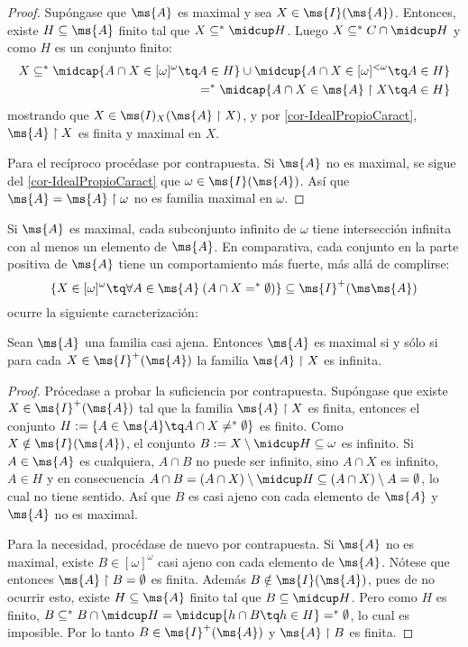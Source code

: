 	\begin{proof}
		Supóngase que $\ms{A}$ es maximal y sea $X \in \ms{I}(\ms{A})$. Entonces, existe $H \subseteq \ms{A}$ finito tal que $X \subseteq^* \midcup H$. Luego $X \subseteq^* C \cap \midcup H$ y como $H$ es un conjunto finito:
		\begin{align*}
			X \subseteq^* \midcap\{ A \cap X \in [\omega]^\omega \tq A \in H \} \cup \midcup\{ A \cap X \in [\omega]^{<\omega} \tq A \in H \} \\
			=^* \midcap\{ A \cap X \in \ms{A} \upharpoonright X \tq A \in H \}
		\end{align*}
		mostrando que $X \in \ms(I)_X(\ms{A}\upharpoonright X)$, y por \ref{cor-IdealPropioCaract}, $\ms{A} \upharpoonright X$ es finita y maximal en $X$.

		Para el recíproco procédase por contrapuesta. Si $\ms{A}$ no es maximal, se sigue del \autoref{cor-IdealPropioCaract} que $\omega \in \ms{I}(\ms{A})$. Así que $\ms{A} = \ms{A} \upharpoonright \omega$ no es familia maximal en $\omega$. 
	\end{proof}

	Si $\ms{A}$ es maximal, cada subconjunto infinito de $\omega$ tiene intersección infinita con al menos un elemento de $\ms{A}$. En comparativa, cada conjunto en la parte positiva de $\ms{A}$ tiene un comportamiento más fuerte, más allá de complirse:
	\[ \{X \in [\omega]^{\omega} \tq \forall A \in \ms{A} \: (A \cap X =^* \emptyset) \} \subseteq \ms{I}^+(\ms\ms{A}) \]
	ocurre la siguiente caracterización:

	\begin{proposicion}\label{prop-CaracMADPositiv}
		Sean $\ms{A}$ una familia casi ajena. Entonces $\ms{A}$ es maximal si y sólo si para cada $X \in \ms{I}^+(\ms{A})$ la familia $\ms{A} \upharpoonright X$ es infinita.
	\end{proposicion}
	
	\begin{proof}
		Prócedase a probar la suficiencia por contrapuesta. Supóngase que existe $X \in \ms{I}^+(\ms{A})$ tal que la familia $\ms{A} \upharpoonright X$ es finita, entonces el conjunto $H:=\{ A \in \ms{A} \tq A \cap X \neq^* \emptyset \}$ es finito. Como $X \notin \ms{I}(\ms{A})$, el conjunto $B:=X \setminus \midcup H \subseteq \omega$ es infinito. Si $A \in \ms{A}$ es cualquiera, $A \cap B$ no puede ser infinito, sino $A \cap X$ es infinito, $A \in H$ y en consecuencia $A \cap B = (A \cap X) \setminus \midcup H \subseteq (A \cap X) \setminus A = \emptyset$, lo cual no tiene sentido. Así que $B$ es casi ajeno con cada elemento de $\ms{A}$ y $\ms{A}$ no es maximal.
	
		Para la necesidad, procédase de nuevo por contrapuesta. Si $\ms{A}$ no es maximal, existe $B \in [\omega]^\omega$ casi ajeno con cada elemento de $\ms{A}$. Nótese que entonces $\ms{A} \upharpoonright B = \emptyset$ es finita. Además $B \notin \ms{I}(\ms{A})$, pues de no ocurrir esto, existe $H \subseteq \ms{A}$ finito tal que $B \subseteq \midcup H$. Pero como $H$ es finito, $B \subseteq^* B \cap \midcup H = \midcup \{ h \cap B \tq h \in H \} =^* \emptyset$, lo cual es imposible. Por lo tanto $B \in \ms{I}^+(\ms{A})$ y $\ms{A} \upharpoonright B$ es finita. 
	\end{proof}
	
